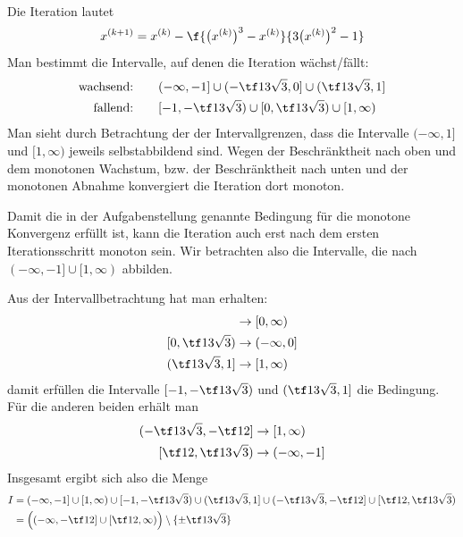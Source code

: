 \documentclass{mywork}
\begin{document}
\begin{aufgabe}~

	Die Iteration lautet
	\[
		x^{(k+1)} = x^{(k)} - \f {\big(x^{(k)}\big)^3 - x^{(k)}}{3\big(x^{(k)}\big)^2 - 1}
	\]
	Man bestimmt die Intervalle, auf denen die Iteration wächst/fällt:
	\begin{align*}
		\text{wachsend:} &\qquad (-\infty,-1] \cup (-\tf 13\sqrt 3, 0] \cup (\tf 13\sqrt 3, 1] \\
		\text{fallend:} &\qquad [-1, -\tf 13\sqrt 3) \cup [0,\tf 13 \sqrt3) \cup [1,\infty)
	\end{align*}
	Man sieht durch Betrachtung der der Intervallgrenzen, dass die Intervalle $(-\infty, 1]$ und $[1,\infty)$ jeweils selbstabbildend sind.
	Wegen der Beschränktheit nach oben und dem monotonen Wachstum, bzw. der Beschränktheit nach unten und der monotonen Abnahme konvergiert die Iteration dort monoton.

	Damit die in der Aufgabenstellung genannte Bedingung für die monotone Konvergenz erfüllt ist, kann die Iteration auch erst nach dem ersten Iterationsschritt monoton sein.
	Wir betrachten also die Intervalle, die nach $(-\infty, -1] \cup [1,\infty)$ abbilden.

	Aus der Intervallbetrachtung hat man erhalten:
	\begin{align*}
		[-1, -\tf13 \sqrt 3) &\to (-\infty, -1) \\
		(-\tf13 \sqrt 3, 0] &\to [0, \infty) \\
		[0, \tf13 \sqrt 3) &\to (-\infty, 0] \\
		(\tf13 \sqrt3, 1] &\to [1, \infty)
	\end{align*}
	damit erfüllen die Intervalle $[-1,-\tf 13 \sqrt3)$ und $(\tf13 \sqrt3, 1]$ die Bedingung.
	Für die anderen beiden erhält man
	\begin{align*}
		(-\tf13 \sqrt3, -\tf 12] &\to [1,\infty) \\
		[\tf 12, \tf13 \sqrt3) &\to (-\infty, -1]
	\end{align*}
	Insgesamt ergibt sich also die Menge
	\begin{align*}
		I &= (-\infty, -1] \cup [1,\infty) \cup [-1,-\tf 13 \sqrt3) \cup (\tf13 \sqrt3, 1] \cup
		(-\tf13 \sqrt3, -\tf 12] \cup
		[\tf 12, \tf13 \sqrt3) \\
		&= \Big( (-\infty, -\tf 12] \cup [\tf 12, \infty) \Big) \setminus \{\pm \tf13 \sqrt 3\}
	\end{align*}
\end{aufgabe}
\newpage
\end{document}
